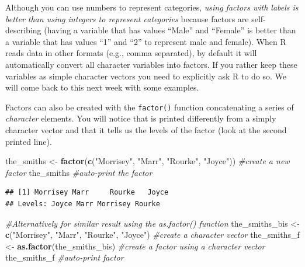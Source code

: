 \documentclass[]{book}
\newenvironment{Shaded}{\begin{snugshade}}{\end{snugshade}}
\newcommand{\CommentTok}[1]{\textcolor[rgb]{0.56,0.35,0.01}{\textit{#1}}}
\newcommand{\KeywordTok}[1]{\textcolor[rgb]{0.13,0.29,0.53}{\textbf{#1}}}
\newcommand{\NormalTok}[1]{#1}
\newcommand{\StringTok}[1]{\textcolor[rgb]{0.31,0.60,0.02}{#1}}
\begin{document}
Although you can use numbers to represent categories, \emph{using factors with labels is better than using integers to represent categories} because factors are self-describing (having a variable that has values ``Male'' and ``Female'' is better than a variable that has values ``1'' and ``2'' to represent male and female). When R reads data in other formats (e.g., comma separated), by default it will automatically convert all character variables into factors. If you rather keep these variables as simple character vectors you need to explicitly ask R to do so. We will come back to this next week with some examples.

Factors can also be created with the \texttt{factor()} function concatenating a series of \emph{character} elements. You will notice that is printed differently from a simply character vector and that it tells us the levels of the factor (look at the second printed line).

\begin{Shaded}
\begin{Highlighting}[]
\NormalTok{the_smiths <-}\StringTok{ }\KeywordTok{factor}\NormalTok{(}\KeywordTok{c}\NormalTok{(}\StringTok{"Morrisey"}\NormalTok{, }\StringTok{"Marr"}\NormalTok{, }\StringTok{"Rourke"}\NormalTok{, }\StringTok{"Joyce"}\NormalTok{)) }\CommentTok{#create a new factor}
\NormalTok{the_smiths }\CommentTok{#auto-print the factor}
\end{Highlighting}
\end{Shaded}

\begin{verbatim}
## [1] Morrisey Marr     Rourke   Joyce   
## Levels: Joyce Marr Morrisey Rourke
\end{verbatim}

\begin{Shaded}
\begin{Highlighting}[]
\CommentTok{#Alternatively for similar result using the as.factor() function}
\NormalTok{the_smiths_bis <-}\StringTok{ }\KeywordTok{c}\NormalTok{(}\StringTok{"Morrisey"}\NormalTok{, }\StringTok{"Marr"}\NormalTok{, }\StringTok{"Rourke"}\NormalTok{, }\StringTok{"Joyce"}\NormalTok{) }\CommentTok{#create a character vector}
\NormalTok{the_smiths_f <-}\StringTok{ }\KeywordTok{as.factor}\NormalTok{(the_smiths_bis) }\CommentTok{#create a factor using a character vector}
\NormalTok{the_smiths_f }\CommentTok{#auto-print factor}
\end{Highlighting}
\end{Shaded}
\end{document}
